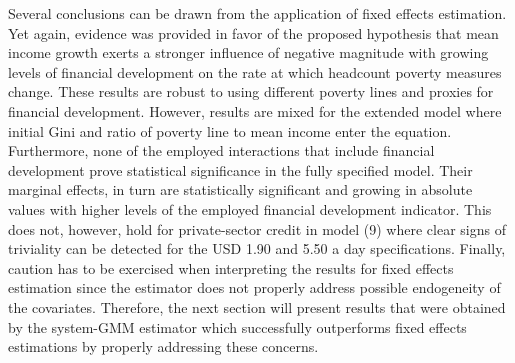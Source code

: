 \documentclass[12pt, a4paper]{article}
\begin{document}
Several conclusions can be drawn from the application of fixed effects estimation. Yet again, evidence was provided in favor of the proposed hypothesis that mean income growth exerts a stronger influence of negative magnitude with growing levels of financial development on the rate at which headcount poverty measures change. These results are robust to using different poverty lines and proxies for financial development. However, results are mixed for the extended model where initial Gini and ratio of poverty line to mean income enter the equation. Furthermore, none of the employed interactions that include financial development prove statistical significance in the fully specified model. Their marginal effects, in turn are statistically significant and growing in absolute values with higher levels of the employed financial development indicator. This does not, however, hold for private-sector credit in model (9) where clear signs of triviality can be detected for the USD 1.90 and 5.50 a day specifications. Finally, caution has to be exercised when interpreting the results for fixed effects estimation since the estimator does not properly address possible endogeneity of the covariates. Therefore, the next section will present results that were obtained by the system-GMM estimator which successfully outperforms fixed effects estimations by properly addressing these concerns.
\end{document}

